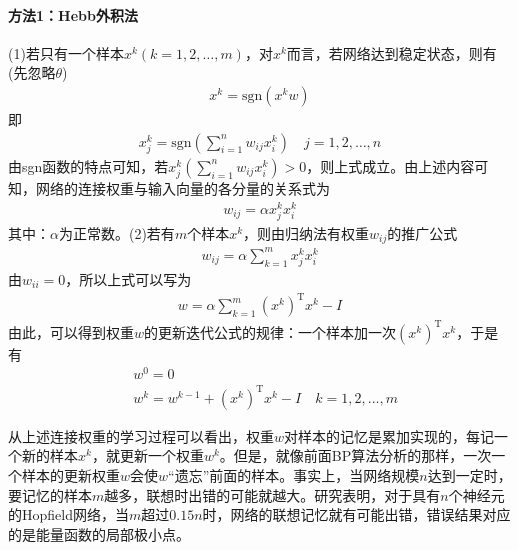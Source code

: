{            \paragraph{方法1：Hebb外积法}(1)若只有一个样本$x^k(k=1,2,\dots,m)$，对$x^k$而言，若网络达到稳定状态，则有(先忽略$\theta$)
            \begin{align*}
            x^k = \mathrm{sgn}(x^kw)
            \end{align*}
            即
            \begin{align*}
            x_j^k = \mathrm{sgn} \left( \sum_{i=1}^n w_{ij}x_i^k \right) \quad j=1,2,\dots,n
            \end{align*}
            由sgn函数的特点可知，若$x_j^k\left( \sum_{i=1}^n w_{ij}x_i^k \right)>0$，则上式成立。由上述内容可知，网络的连接权重与输入向量的各分量的关系式为
            \begin{align*}
            w_{ij} = \alpha x_j^kx_i^k
            \end{align*}
            其中：$\alpha$为正常数。(2)若有$m$个样本$x^k$，则由归纳法有权重$w_{ij}$的推广公式
            \begin{align*}
            w_{ij}  = \alpha \sum_{k=1}^mx_j^kx_i^k
            \end{align*}
            由$w_{ii} = 0$，所以上式可以写为
            \begin{align*}
            w = \alpha  \sum_{k=1}^m(x^k)^\mathrm{T}x^k - I
            \end{align*}
            由此，可以得到权重$w$的更新迭代公式的规律：一个样本加一次$(x^k)^\mathrm{T}x^k$，于是有
            \begin{align*}
            & w^0 = 0\\
            & w^k = w^{k-1}+(x^k)^\mathrm{T}x^k - I \quad k = 1,2,\dots,m
            \end{align*}
            \par
            从上述连接权重的学习过程可以看出，权重$w$对样本的记忆是累加实现的，每记一个新的样本$x^k$，就更新一个权重$w^k$。但是，就像前面BP算法分析的那样，一次一个样本的更新权重$w$会使$w$“遗忘”前面的样本。事实上，当网络规模$n$达到一定时，要记忆的样本$m$越多，联想时出错的可能就越大。研究表明，对于具有$n$个神经元的Hopfield网络，当$m$超过$0.15n$时，网络的联想记忆就有可能出错，错误结果对应的是能量函数的局部极小点。
}
